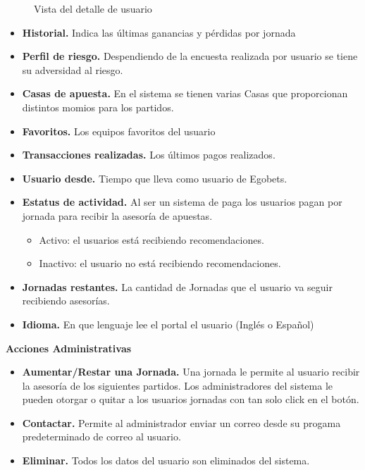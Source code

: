 \begin{figure}[!htb]\centering
   \begin {minipage}{1\textwidth}
     \caption{Vista del detalle de usuario}
	 \label{Fig:Detalle-usuario}
   \end{minipage}
\end{figure}

\begin{itemize}
	\item \textbf{Historial.} Indica las últimas ganancias y pérdidas por jornada
	\item \textbf{Perfil de riesgo.} Despendiendo de la encuesta realizada por usuario se tiene su adversidad al riesgo.
	\item \textbf{Casas de apuesta.} En el sistema se tienen varias Casas que proporcionan distintos momios para los partidos.
	\item \textbf{Favoritos.} Los equipos favoritos del usuario
	\item \textbf{Transacciones realizadas.} Los últimos pagos realizados.
	\item \textbf{Usuario desde.} Tiempo que lleva como usuario de Egobets.
	\item \textbf{Estatus de actividad.} Al ser un sistema de paga los usuarios pagan por jornada para recibir la asesoría de apuestas.
		\begin{itemize}
			\item Activo: el usuarios está recibiendo recomendaciones.
			\item Inactivo: el usuario no está recibiendo recomendaciones.
		\end{itemize}
	\item \textbf{Jornadas restantes.} La cantidad de Jornadas que el usuario va seguir recibiendo asesorías.
	\item \textbf{Idioma.} En que lenguaje lee el portal el usuario (Inglés o Español)
\end{itemize}

\textbf{Acciones Administrativas}
\begin{itemize}
\item \textbf{Aumentar/Restar una Jornada.}
Una jornada le permite al usuario recibir la asesoría de los siguientes partidos.
Los administradores del sistema le pueden otorgar o quitar a los usuarios jornadas con tan solo click en el botón.

\item \textbf{Contactar.}
Permite al administrador enviar un correo desde su progama predeterminado de correo al usuario.

\item \textbf{Eliminar.} Todos los datos del usuario son eliminados del sistema.
\end{itemize}


